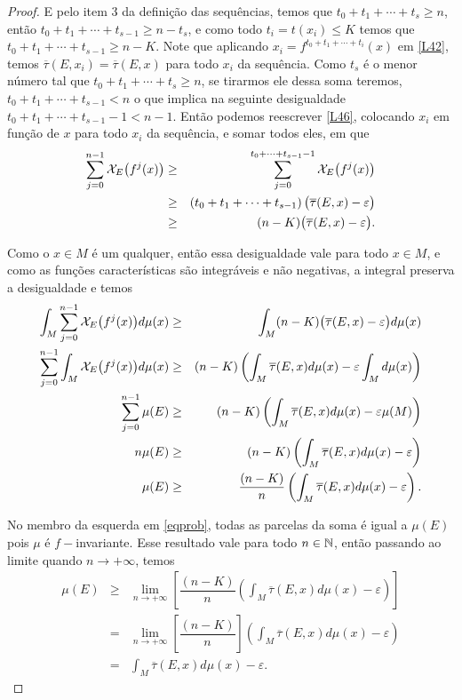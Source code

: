 \begin{proof}
E pelo item 3 da definição das sequências, temos que $t_0+t_1+\cdots+t_{s}\geq n$, então $t_0+t_1+\cdots+t_{s-1}\geq n-t_s$, e como todo $t_i=t(x_i)\leq K$ temos que $t_0+t_1+\cdots+t_{s-1}\geq n-K$. Note que aplicando $x_i=f^{t_0+t_1+\cdots+t_{i}}(x)$ em \eqref{L42}, temos $\overline{\tau}(E,x_i)=\overline{\tau}(E,x)$ para todo $x_i$ da sequência. Como $t_s$ é o menor número tal que $t_0+t_1+\cdots+t_{s}\geq n$, se tirarmos ele dessa soma teremos, $t_0+t_1+\cdots+t_{s-1}<n$ o que implica na seguinte desigualdade $t_0+t_1+\cdots+t_{s-1}-1< n-1$. Então podemos reescrever \eqref{L46}, colocando $x_i$ em função de $x$ para todo $x_i$ da sequência, e somar todos eles, em que 
\begin{eqnarray}
\sum_{j=0}^{n-1}\mathcal{X}_{E}\big(f^j(x)\big) & \geq & \sum_{j=0}^{t_0+\cdots+t_{s-1}-1}\mathcal{X}_{E}\big(f^j(x)\big)\nonumber\\
& \geq & \left(t_0+t_1+\cdots+t_{s-1}\right)\big(\overline{\tau}(E,x)-\varepsilon\big)\nonumber\\
& \geq & (n-K)\big(\overline{\tau}(E,x)-\varepsilon\big).\label{L477}
\end{eqnarray}

Como o $x\in M$ é um qualquer, então essa desigualdade vale para todo $x\in M$, e como as funções características são integráveis e não negativas, a integral preserva a desigualdade e temos
\begin{eqnarray}
\int_{M}\sum_{j=0}^{n-1}\mathcal{X}_{E}\big(f^j(x)\big)d\mu(x) & \geq & \int_{M}(n-K)\big(\overline{\tau}(E,x)-\varepsilon\big)d\mu(x)\nonumber\\
\sum_{j=0}^{n-1}\int_{M}\mathcal{X}_{E}\big(f^j(x)\big)d\mu(x) & \geq & (n-K)\left(\int_{M}\overline{\tau}(E,x)d\mu(x)-\varepsilon\int_{M} d\mu(x)\right)\label{eqprob}\\
\sum_{j=0}^{n-1}\mu(E) & \geq & (n-K)\left(\int_{M}\overline{\tau}(E,x)d\mu(x)-\varepsilon\mu(M)\right)\nonumber\\
n\mu(E) & \geq & (n-K)\left(\int_{M}\overline{\tau}(E,x)d\mu(x)-\varepsilon\right)\nonumber\\
\mu(E) & \geq & \dfrac{(n-K)}{n}\left(\int_{M}\overline{\tau}(E,x)d\mu(x)-\varepsilon\right).\nonumber
\end{eqnarray}

No membro da esquerda em \eqref{eqprob}, todas as parcelas da soma é igual a $\mu(E)$ pois $\mu$ é $f-$invariante. Esse resultado vale para todo $n\in\mathbb{N}$, então passando ao limite quando $n\to+\infty$, temos
\begin{eqnarray*}
\mu(E) & \geq & \lim_{n\to+\infty}\left[\dfrac{(n-K)}{n}\left(\int_{M}\overline{\tau}(E,x)d\mu(x)-\varepsilon\right)\right]\\
& = & \lim_{n\to+\infty}\left[\dfrac{(n-K)}{n}\right]\left(\int_{M}\overline{\tau}(E,x)d\mu(x)-\varepsilon\right)\\
& = & \int_{M}\overline{\tau}(E,x)d\mu(x)-\varepsilon.
\end{eqnarray*}


\end{proof}
